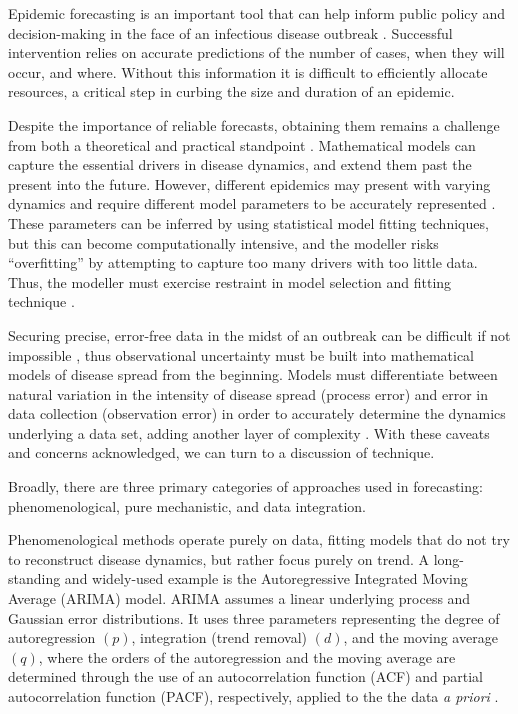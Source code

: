 
Epidemic forecasting is an important tool that can help inform public policy and decision-making in the face of an infectious disease outbreak \cite{Chretien2014}\cite{Nsoesie2014}\cite{Yang2014}. Successful intervention relies on accurate predictions of the number of cases, when they will occur, and where. Without this information it is difficult to efficiently allocate resources, a critical step in curbing the size and duration of an epidemic.

Despite the importance of reliable forecasts, obtaining them remains a challenge from both a theoretical and practical standpoint \cite{Nsoesie2014}. Mathematical models can capture the essential drivers in disease dynamics, and extend them past the present into the future. However, different epidemics may present with varying dynamics and require different model parameters to be accurately represented \cite{Camacho2011}. These parameters can be inferred by using statistical model fitting techniques, but this can become computationally intensive, and the modeller risks ``overfitting'' by attempting to capture too many drivers with too little data. Thus, the modeller must exercise restraint in model selection and fitting technique \cite{Babyak2004}.

Securing precise, error-free data in the midst of an outbreak can be difficult if not impossible \cite{Shaman2014}, thus observational uncertainty must be built into mathematical models of disease spread from the beginning. Models must differentiate between natural variation in the intensity of disease spread (process error) and error in data collection (observation error) in order to accurately determine the dynamics underlying a data set, adding another layer of complexity \cite{King2015}. With these caveats and concerns acknowledged, we can turn to a discussion of technique.

Broadly, there are three primary categories of approaches used in forecasting: phenomenological, pure mechanistic, and data integration.

Phenomenological methods operate purely on data, fitting models that do not try to reconstruct disease dynamics, but rather focus purely on trend. A long-standing and widely-used example is the Autoregressive Integrated Moving Average (ARIMA) model. ARIMA assumes a linear underlying process and Gaussian error distributions. It uses three parameters representing the degree of autoregression $(p)$, integration (trend removal) $(d)$, and the moving average $(q)$, where the orders of the autoregression and the moving average are determined through the use of an autocorrelation function (ACF) and partial autocorrelation function (PACF), respectively, applied to the the data \textit{a priori} \cite{Zhang2013}.

